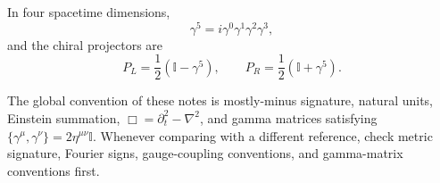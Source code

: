 In four spacetime dimensions,
\[
    \gamma^5=i\gamma^0\gamma^1\gamma^2\gamma^3,
\]
and the chiral projectors are
\[
    P_L=\frac{1}{2}(\mathbb{I}-\gamma^5),
    \qquad
    P_R=\frac{1}{2}(\mathbb{I}+\gamma^5).
\]

\begin{summarybox}
The global convention of these notes is mostly-minus signature, natural units,
Einstein summation, \(\Box=\partial_t^2-\nabla^2\), and gamma matrices satisfying
\(\{\gamma^\mu,\gamma^\nu\}=2\eta^{\mu\nu}\mathbb{I}\). Whenever comparing with a
different reference, check metric signature, Fourier signs, gauge-coupling
conventions, and gamma-matrix conventions first.
\end{summarybox}
